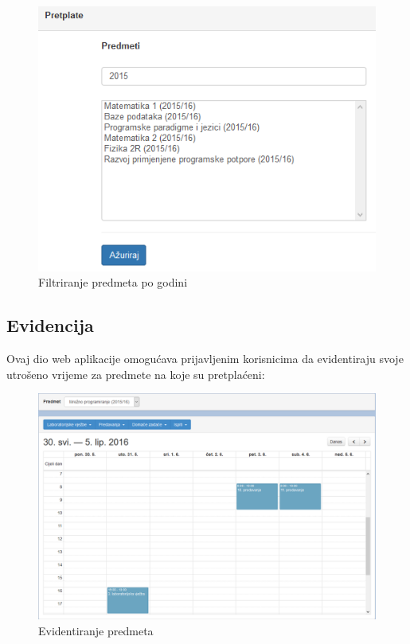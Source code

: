 \documentclass[times, utf8, zavrsni]{fer}
\begin{document}
\begin{figure}[H]
\centering
\includegraphics[width=\textwidth,height=\textheight,keepaspectratio]{img/filtriranje.png}
\caption{Filtriranje predmeta po godini}
\label{fig:filtriranje}
\end{figure}

\subsection{Evidencija}
Ovaj dio web aplikacije omogućava prijavljenim korisnicima da evidentiraju svoje utrošeno vrijeme za predmete na koje su pretplaćeni:

\begin{figure}[H]
\centering
\includegraphics[width=\textwidth,height=\textheight,keepaspectratio]{img/evidencija-web.png}
\caption{Evidentiranje predmeta}
\label{fig:evidencija-web}
\end{figure}
\end{document}
